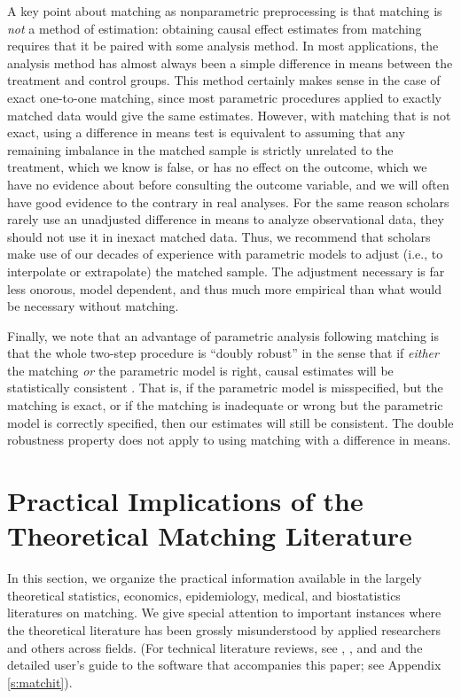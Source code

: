 \documentclass[11pt,titlepage]{article}
\begin{document}
A key point about matching as nonparametric preprocessing is that
matching is \emph{not} a method of estimation: obtaining causal effect
estimates from matching requires that it be paired with some analysis
method.  In most applications, the analysis method has almost always
been a simple difference in means between the treatment and control
groups.  This method certainly makes sense in the case of exact
one-to-one matching, since most parametric procedures applied to
exactly matched data would give the same estimates.  However, with
matching that is not exact, using a difference in means test is
equivalent to assuming that any remaining imbalance in the matched
sample is strictly unrelated to the treatment, which we know is false,
or has no effect on the outcome, which we have no evidence about
before consulting the outcome variable, and we will often have good
evidence to the contrary in real analyses.  For the same reason
scholars rarely use an unadjusted difference in means to analyze
observational data, they should not use it in inexact matched data.
Thus, we recommend that scholars make use of our decades of experience
with parametric models to adjust (i.e., to interpolate or extrapolate)
the matched sample.  The adjustment necessary is far less onorous,
model dependent, and thus much more empirical than what would be
necessary without matching.

Finally, we note that an advantage of parametric analysis following
matching is that the whole two-step procedure is ``doubly robust'' in
the sense that if \emph{either} the matching \emph{or} the parametric
model is right, causal estimates will be statistically consistent
\citep[see][]{RobRot01}.  That is, if the parametric model is
misspecified, but the matching is exact, or if the matching is
inadequate or wrong but the parametric model is correctly specified,
then our estimates will still be consistent.  The double robustness
property does not apply to using matching with a difference in means.


\section{Practical Implications of the Theoretical Matching Literature}\label{s:choose}

In this section, we organize the practical information available in
the largely theoretical statistics, economics, epidemiology, medical,
and biostatistics literatures on matching.  We give special attention
to important instances where the theoretical literature has been
grossly misunderstood by applied researchers and others across fields.
(For technical literature reviews, see \citet{Imbens04},
\citet{Rosenbaum02}, and \citet{Stuart04} and the detailed user's
guide to the software that accompanies this paper; see Appendix
\ref{s:matchit}).
\end{document}
